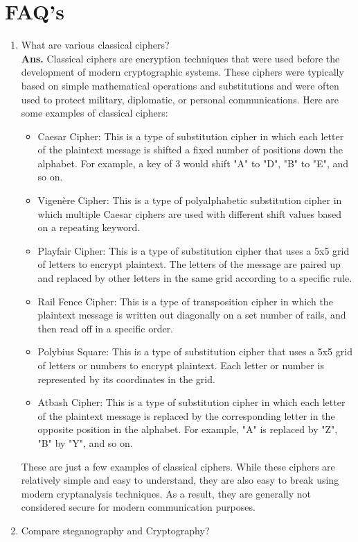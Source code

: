 \documentclass{article}
\begin{document}
\section{\textbf{FAQ's}}
\begin{enumerate}
	\item What are various classical ciphers?\\
	
	\textbf{Ans.}  Classical ciphers are encryption techniques that were used before the development of modern cryptographic systems. These ciphers were typically based on simple mathematical operations and substitutions and were often used to protect military, diplomatic, or personal communications. Here are some examples of classical ciphers:
	\begin{itemize}
		\item Caesar Cipher: This is a type of substitution cipher in which each letter of the plaintext message is shifted a fixed number of positions down the alphabet. For example, a key of 3 would shift "A" to "D", "B" to "E", and so on.
		\item Vigenère Cipher: This is a type of polyalphabetic substitution cipher in which multiple Caesar ciphers are used with different shift values based on a repeating keyword.
		\item Playfair Cipher: This is a type of substitution cipher that uses a 5x5 grid of letters to encrypt plaintext. The letters of the message are paired up and replaced by other letters in the same grid according to a specific rule.
		\item Rail Fence Cipher: This is a type of transposition cipher in which the plaintext message is written out diagonally on a set number of rails, and then read off in a specific order.
		\item Polybius Square: This is a type of substitution cipher that uses a 5x5 grid of letters or numbers to encrypt plaintext. Each letter or number is represented by its coordinates in the grid.
		\item Atbash Cipher: This is a type of substitution cipher in which each letter of the plaintext message is replaced by the corresponding letter in the opposite position in the alphabet. For example, "A" is replaced by "Z", "B" by "Y", and so on.
	\end{itemize}
	These are just a few examples of classical ciphers. While these ciphers are relatively simple and easy to understand, they are also easy to break using modern cryptanalysis techniques. As a result, they are generally not considered secure for modern communication purposes.
	\item Compare steganography and Cryptography?\\
	

\end{enumerate}
\end{document}
